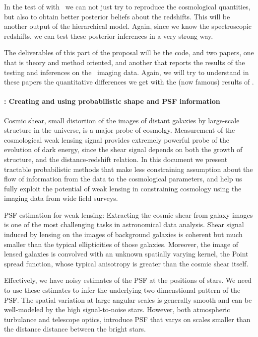 \documentclass[12pt]{article}
\begin{document}
In the test of  with \sdss\ we can not just try to
reproduce the cosmological quantities, but also to obtain better
posterior beliefs about the redshifts.
This will be another output of the hierarchical model.
Again, since we know the spectroscopic redshifts, we can test these
posterior inferences in a very strong way.

The deliverables of this part of the proposal will be the
 code, and two papers, one that is theory and
method oriented, and another that reports the results of the testing
and inferences on the \sdss\ imaging data.
Again, we will try to understand in these papers the quantitative
differences we get with the (now famous) results of \sdss.

\paragraph{: Creating and using probabilistic shape and PSF information}

Cosmic shear, small distortion of the images of distant
galaxies by large-scale structure in the universe,
is a major probe of cosmolgy. Measurement of the cosmological
weak lensing signal provides extremely powerful probe of the
evolution of dark energy, since the shear signal depends on
both the growth of structure, and the distance-redshift relation.
In this document we present tractable probabilistic methods that
make less constraining assumption about the flow of information
from the data to the cosmological parameters, and help us fully exploit
the potential of weak lensing in  constraining cosmology using the
imaging data from wide field surveys.

PSF estimation for weak lensing:
Extracting the cosmic shear from galaxy images is one of the most challenging tasks in astronomical
data analysis. Shear signal induced by lensing on the images of background galaxies
is coherent but much smaller than the typical 
ellipticities of those galaxies. Moreover, the image of lensed galaxies is convolved with 
an unknown spatially varying kernel, the Point spread function, whose typical
anisotropy is greater than the cosmic shear itself.
 
Effectively, we have 
noisy estimates of the PSF at the positions of stars. We need to use these estimates to infer the
underlying two dimenstional pattern of the PSF. The spatial variation at large angular scales is 
generally smooth and can be well-modeled by the high signal-to-noise stars. However, both atmospheric
turbulance and telescope optics, introduce PSF that varys on scales smaller than the distance
distance between the bright stars. 
\end{document}

